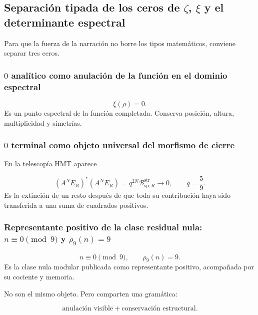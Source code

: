 \subsection{Separación tipada de los ceros de \(\zeta\), \(\xi\) y el determinante espectral}
Para que la fuerza de la narración no borre los tipos matemáticos, conviene separar tres ceros.\par
{}
\subsubsection{\(0\) analítico como anulación de la función en el dominio espectral}
\[
\xi(\rho)=0.
\]
Es un punto espectral de la función completada. Conserva posición, altura, multiplicidad y simetrías.\par
{}
\subsubsection{\(0\) terminal como objeto universal del morfismo de cierre}
En la telescopía HMT aparece\par
\[
(A^NE_R)^*(A^NE_R)
=
q^{2N}
\mathcal B_{\mathrm{sp},R}^{\mathrm{str}}
\longrightarrow0,
\qquad
q=\frac59.
\]
Es la extinción de un resto después de que toda su contribución haya sido transferida a una suma de cuadrados positivos.\par
{}
\subsubsection{Representante positivo de la clase residual nula: \(n\equiv0\pmod 9\) y \(\rho_9(n)=9\)}
\[
n\equiv0\pmod9,
\qquad
\rho_9(n)=9.
\]
Es la clase nula modular publicada como representante positivo, acompañada por su cociente y memoria.\par
No son el mismo objeto. Pero comparten una gramática:\par
\[
\text{anulación visible}
+
\text{conservación estructural}.
\]
